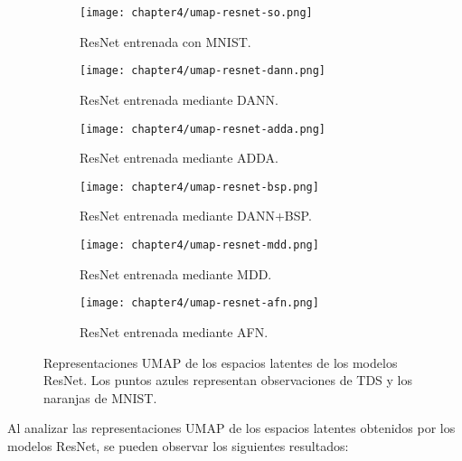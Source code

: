 \begin{figure}[H]
    \centering
    \begin{subfigure}[h]{0.40\textwidth}
        \texttt{[image: chapter4/umap-resnet-so.png]}
        \caption{ResNet entrenada con MNIST.}
        \label{fig:umap-resnet-so}
    \end{subfigure}
    \hfill
    \begin{subfigure}[h]{0.40\textwidth}
        \texttt{[image: chapter4/umap-resnet-dann.png]}
        \caption{ResNet entrenada mediante DANN.}
        \label{fig:umap-resnet-dann}
    \end{subfigure}
    \hfill
    \begin{subfigure}[h]{0.40\textwidth}
        \texttt{[image: chapter4/umap-resnet-adda.png]}
        \caption{ResNet entrenada mediante ADDA.}
        \label{fig:umap-resnet-adda}
    \end{subfigure}
    \hfill
    \begin{subfigure}[h]{0.40\textwidth}
        \texttt{[image: chapter4/umap-resnet-bsp.png]}
        \caption{ResNet entrenada mediante DANN+BSP.}
        \label{fig:umap-resnet-bsp}
    \end{subfigure}
    \hfill
    \begin{subfigure}[h]{0.40\textwidth}
        \texttt{[image: chapter4/umap-resnet-mdd.png]}
        \caption{ResNet entrenada mediante MDD.}
        \label{fig:umap-resnet-mdd}
    \end{subfigure}
    \hfill
    \begin{subfigure}[h]{0.40\textwidth}
        \texttt{[image: chapter4/umap-resnet-afn.png]}
        \caption{ResNet entrenada mediante AFN.}
        \label{fig:umap-resnet-afn}
    \end{subfigure}

    \caption{Representaciones UMAP de los espacios latentes de los modelos ResNet. Los puntos azules representan observaciones de TDS y los naranjas de MNIST.}
    \label{fig:umaps-renet}
\end{figure}

Al analizar las representaciones UMAP de los espacios latentes obtenidos por los modelos ResNet, se pueden observar los
siguientes resultados:

